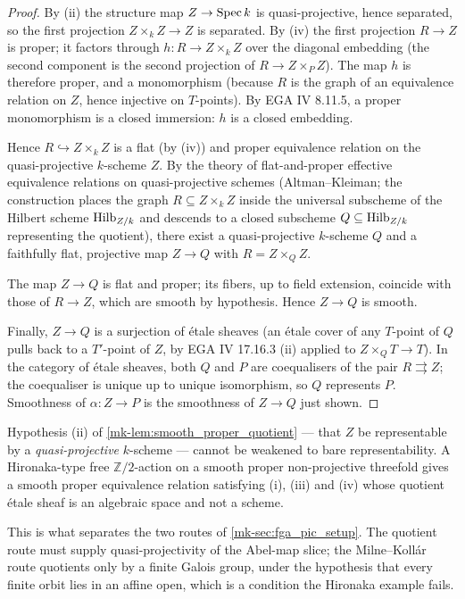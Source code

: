 \begin{proof}
  By (ii) the structure map \(Z \to \operatorname{Spec} k\) is quasi-projective, hence
  separated, so the first projection \(Z \times_k Z \to Z\) is separated.
  By (iv) the first projection \(R \to Z\) is proper; it factors through
  \(h : R \to Z \times_k Z\) over the diagonal embedding (the second
  component is the second projection of \(R \to Z \times_P Z\)). The map
  \(h\) is therefore proper, and a monomorphism (because \(R\) is the graph
  of an equivalence relation on \(Z\), hence injective on \(T\)-points).
  By EGA IV 8.11.5, a proper monomorphism is a closed immersion: \(h\) is a
  closed embedding.

  Hence \(R \hookrightarrow Z \times_k Z\) is a flat (by (iv)) and proper
  equivalence relation on the quasi-projective \(k\)-scheme \(Z\). By the
  theory of flat-and-proper effective equivalence relations on
  quasi-projective schemes (Altman--Kleiman; the construction places
  the graph \(R \subseteq Z \times_k Z\) inside the universal subscheme of
  the Hilbert scheme \(\operatorname{Hilb}_{Z/k}\) and descends to a closed subscheme
  \(Q \subseteq \operatorname{Hilb}_{Z/k}\) representing the quotient), there exist a
  quasi-projective \(k\)-scheme \(Q\) and a faithfully flat, projective map
  \(Z \to Q\) with \(R = Z \times_Q Z\).

  The map \(Z \to Q\) is flat and proper; its fibers, up to field
  extension, coincide with those of \(R \to Z\), which are smooth by
  hypothesis. Hence \(Z \to Q\) is smooth.

  Finally, \(Z \to Q\) is a surjection of \'etale sheaves (an \'etale
  cover of any \(T\)-point of \(Q\) pulls back to a \(T'\)-point of \(Z\), by
  EGA IV 17.16.3 (ii) applied to \(Z \times_Q T \to T\)). In the category
  of \'etale sheaves, both \(Q\) and \(P\) are coequalisers of the pair
  \(R \rightrightarrows Z\); the coequaliser is unique up to unique
  isomorphism, so \(Q\) represents \(P\). Smoothness of \(\alpha : Z \to P\)
  is the smoothness of \(Z \to Q\) just shown.
\end{proof}

\begin{remark}
  \label{mk-rem:smooth_proper_quotient_hypothesis}
  Hypothesis (ii) of \ref{mk-lem:smooth_proper_quotient} --- that \(Z\) be
  representable by a \emph{quasi-projective} \(k\)-scheme --- cannot be weakened
  to bare representability. A Hironaka-type free \(\mathbb{Z}/2\)-action on a
  smooth proper non-projective threefold gives a smooth proper equivalence
  relation satisfying (i), (iii) and (iv) whose quotient \'etale sheaf is an
  algebraic space and not a scheme.

  This is what separates the two routes of \ref{mk-sec:fga_pic_setup}. The
  quotient route must supply quasi-projectivity of the Abel-map slice; the
  Milne--Koll\'ar route quotients only by a finite Galois group, under the
  hypothesis that every finite orbit lies in an affine open, which is a
  condition the Hironaka example fails.
\end{remark}

